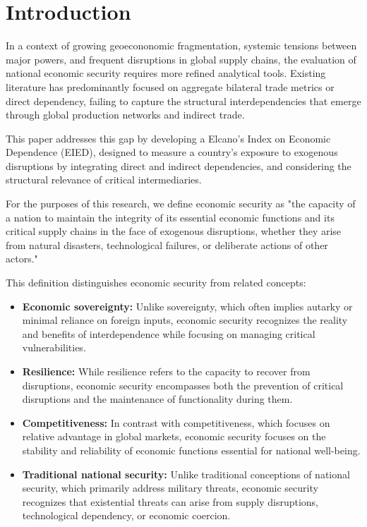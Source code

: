 \documentclass[final,1p,times,authoryear]{elsarticle}
\begin{document}
\section{Introduction}

In a context of growing geoecononomic fragmentation, systemic tensions between major powers, and frequent disruptions in global supply chains, the evaluation of national economic security requires more refined analytical tools. Existing literature has predominantly focused on aggregate bilateral trade metrics or direct dependency, failing to capture the structural interdependencies that emerge through global production networks and indirect trade.

This paper addresses this gap by developing a Elcano's Index on Economic Dependence (EIED), designed to measure a country's exposure to exogenous disruptions by integrating direct and indirect dependencies, and considering the structural relevance of critical intermediaries.

For the purposes of this research, we define economic security as "the capacity of a nation to maintain the integrity of its essential economic functions and its critical supply chains in the face of exogenous disruptions, whether they arise from natural disasters, technological failures, or deliberate actions of other actors."

This definition distinguishes economic security from related concepts:
\begin{itemize}
    \item \textbf{Economic sovereignty:} Unlike sovereignty, which often implies autarky or minimal reliance on foreign inputs, economic security recognizes the reality and benefits of interdependence while focusing on managing critical vulnerabilities.
    \item \textbf{Resilience:} While resilience refers to the capacity to recover from disruptions, economic security encompasses both the prevention of critical disruptions and the maintenance of functionality during them.
    \item \textbf{Competitiveness:} In contrast with competitiveness, which focuses on relative advantage in global markets, economic security focuses on the stability and reliability of economic functions essential for national well-being.
    \item \textbf{Traditional national security:} Unlike traditional conceptions of national security, which primarily address military threats, economic security recognizes that existential threats can arise from supply disruptions, technological dependency, or economic coercion.
\end{itemize}
\end{document}
